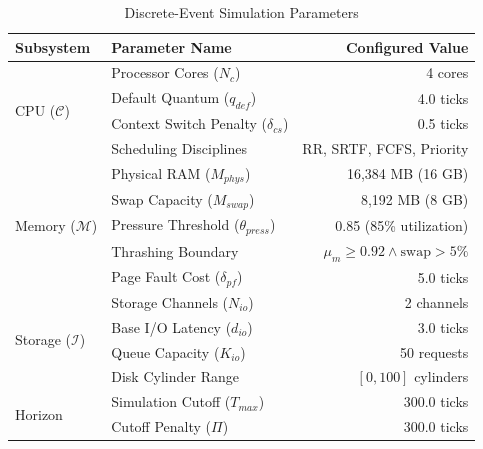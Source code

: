 \documentclass[conference]{IEEEtran}
\begin{document}
\begin{table}[!t]
\caption{Discrete-Event Simulation Parameters}
\label{tab:sim_params}
\centering
\footnotesize
\begin{tabular}{llr}
\toprule
\textbf{Subsystem} & \textbf{Parameter Name} & \textbf{Configured Value} \\
\midrule
\multirow{4}{*}{CPU ($\mathcal{C}$)} & Processor Cores ($N_c$) & 4 cores \\
& Default Quantum ($q_{def}$) & 4.0 ticks \\
& Context Switch Penalty ($\delta_{cs}$) & 0.5 ticks \\
& Scheduling Disciplines & RR, SRTF, FCFS, Priority \\
\midrule
\multirow{5}{*}{Memory ($\mathcal{M}$)} & Physical RAM ($M_{phys}$) & 16,384 MB (16 GB) \\
& Swap Capacity ($M_{swap}$) & 8,192 MB (8 GB) \\
& Pressure Threshold ($\theta_{press}$) & 0.85 (85\% utilization) \\
& Thrashing Boundary & $\mu_m \ge 0.92 \land \text{swap} > 5\%$ \\
& Page Fault Cost ($\delta_{pf}$) & 5.0 ticks \\
\midrule
\multirow{4}{*}{Storage ($\mathcal{I}$)} & Storage Channels ($N_{io}$) & 2 channels \\
& Base I/O Latency ($d_{io}$) & 3.0 ticks \\
& Queue Capacity ($K_{io}$) & 50 requests \\
& Disk Cylinder Range & $[0, 100]$ cylinders \\
\midrule
\multirow{2}{*}{Horizon} & Simulation Cutoff ($T_{max}$) & 300.0 ticks \\
& Cutoff Penalty ($\Pi$) & 300.0 ticks \\
\bottomrule
\end{tabular}
\end{table}
\end{document}
